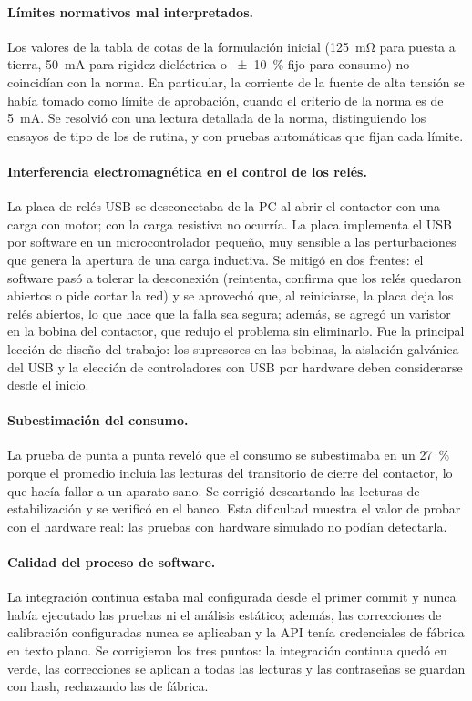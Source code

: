 \paragraph{Límites normativos mal interpretados.}
Los valores de la tabla de cotas de la formulación inicial (\SI{125}{\milli\ohm}
para puesta a tierra, \SI{50}{\milli\ampere} para rigidez dieléctrica o
\SI{\pm 10}{\percent} fijo para consumo) no coincidían con la norma. En
particular, la corriente de la fuente de alta tensión se había tomado como límite
de aprobación, cuando el criterio de la norma es de \SI{5}{\milli\ampere}. Se resolvió con una lectura detallada de la
norma, distinguiendo los ensayos de tipo de los de rutina, y con pruebas
automáticas que fijan cada límite.

\paragraph{Interferencia electromagnética en el control de los relés.}
La placa de relés USB se desconectaba de la PC al abrir el contactor con una carga
con motor; con la carga resistiva no ocurría. La placa implementa el USB por
software en un microcontrolador pequeño, muy sensible a las perturbaciones que
genera la apertura de una carga inductiva. Se mitigó en dos frentes: el software
pasó a tolerar la desconexión (reintenta, confirma que los relés quedaron abiertos
o pide cortar la red) y se aprovechó que, al reiniciarse, la placa deja los relés
abiertos, lo que hace que la falla sea segura; además, se agregó un varistor en la
bobina del contactor, que redujo el problema sin eliminarlo. Fue la principal
lección de diseño del trabajo: los supresores en las bobinas, la aislación
galvánica del USB y la elección de controladores con USB por hardware deben
considerarse desde el inicio.

\paragraph{Subestimación del consumo.}
La prueba de punta a punta reveló que el consumo se subestimaba en un
\SI{27}{\percent} porque el promedio incluía las lecturas del transitorio de cierre
del contactor, lo que hacía fallar a un aparato sano. Se corrigió descartando las
lecturas de estabilización y se verificó en el banco. Esta dificultad muestra el
valor de probar con el hardware real: las pruebas con hardware simulado no podían
detectarla.

\paragraph{Calidad del proceso de software.}
La integración continua estaba mal configurada desde el primer commit y nunca
había ejecutado las pruebas ni el análisis estático; además, las correcciones de
calibración configuradas nunca se aplicaban y la API tenía credenciales de fábrica
en texto plano. Se corrigieron los tres puntos: la integración continua quedó en
verde, las correcciones se aplican a todas las lecturas y las contraseñas se
guardan con hash, rechazando las de fábrica.

